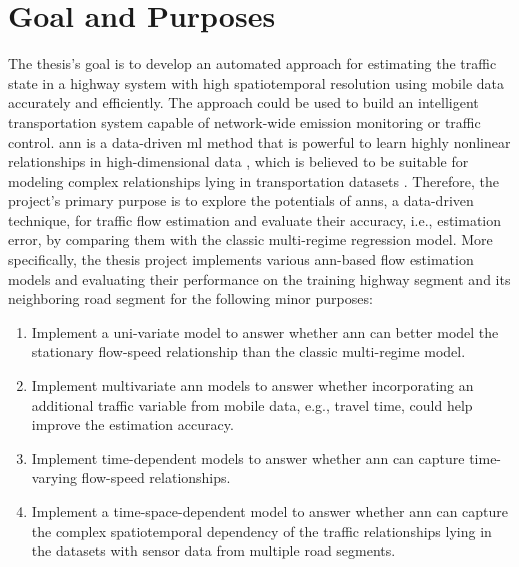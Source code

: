 \documentclass[english]{kththesis}
\begin{document}
\section{Goal and Purposes}
\label{sec:goalAndPurposes}
The thesis's goal is to develop an automated approach for estimating the traffic state in a highway system with high spatiotemporal resolution using mobile data accurately and efficiently. The approach could be used to build an intelligent transportation system capable of network-wide emission monitoring or traffic control. \gls{ann} is a data-driven \gls{ml} method that is powerful to learn highly nonlinear relationships in high-dimensional data \cite{ma_lstm_predict}, which is believed to be suitable for modeling complex relationships lying in transportation datasets \cite{vlahogianni_forecast_overview}. Therefore, the project's primary purpose is to explore the potentials of \glspl{ann}, a data-driven technique, for traffic flow estimation and evaluate their accuracy, i.e., estimation error, by comparing them with the classic multi-regime regression model. More specifically, the thesis project implements various \gls{ann}-based flow estimation models and evaluating their performance on the training highway segment and its neighboring road segment for the following minor purposes:
\begin{enumerate}
    \item Implement a uni-variate model to answer whether \gls{ann} can better model the stationary flow-speed relationship than the classic multi-regime model.
    \item Implement multivariate \gls{ann} models to answer whether incorporating an additional traffic variable from mobile data, e.g., travel time, could help improve the estimation accuracy.
    \item Implement time-dependent models to answer whether \gls{ann} can capture time-varying flow-speed relationships.
    \item Implement a time-space-dependent model to answer whether \gls{ann} can capture the complex spatiotemporal dependency of the traffic relationships lying in the datasets with sensor data from multiple road segments.
\end{enumerate}
\end{document}

